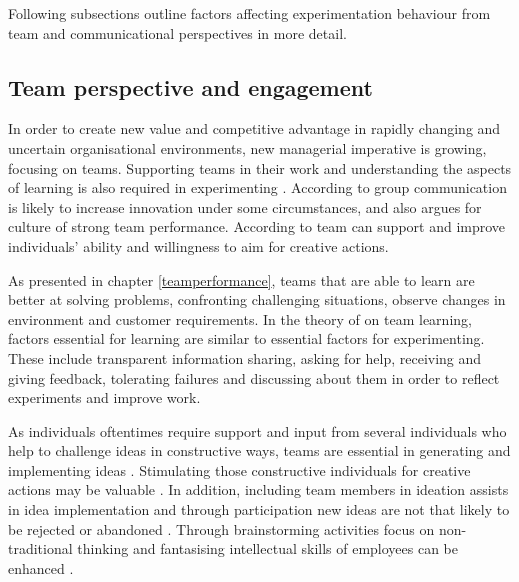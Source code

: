 Following subsections outline factors affecting experimentation behaviour from team and communicational perspectives in more detail. 

\subsection{Team perspective and engagement}
In order to create new value and competitive advantage in rapidly changing and uncertain organisational environments, new managerial imperative is growing, focusing on teams. Supporting teams in their work and understanding the aspects of learning is also required in experimenting \citep{edmondson1999psychological}. According to \citet{monge1992communication} group communication is likely to increase innovation under some circumstances, and also \citet{katzenbach1993wisdom} argues for culture of strong team performance. According to \citet{amabile1996assessing} team can support and improve individuals' ability and willingness to aim for creative actions. 

As presented in chapter \ref{teamperformance}, teams that are able to learn are better at solving problems, confronting challenging situations, observe changes in environment and customer requirements. In the theory of \citet{edmondson1999psychological} on team learning, factors essential for learning are similar to essential factors for experimenting. These include transparent information sharing, asking for help, receiving and giving feedback, tolerating failures and discussing about them in order to reflect experiments and improve work. \citep{edmondson1999psychological}

As individuals oftentimes require support and input from several individuals who help to challenge ideas in constructive ways, teams are essential in generating and implementing ideas \citep{mumford2002social}. Stimulating those constructive individuals for creative actions may be valuable \citep{robinson1997corporate}. In addition, including team members in ideation assists in idea implementation and through participation new ideas are not that likely to be rejected or abandoned \citep{agrell1994team}. Through brainstorming activities focus on non-traditional thinking and fantasising intellectual skills of employees can be enhanced \citep{sosik1998transformational}.

